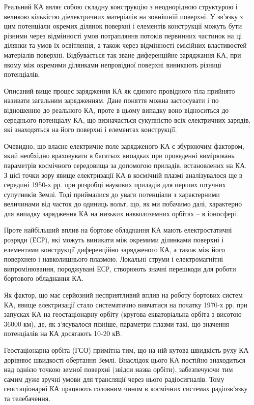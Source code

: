 \documentclass[a4paper,12pt]{article}
\begin{document}
Реальний КА являє собою складну конструкцію з неоднорідною структурою і великою кількістю діелектричних матеріалів на зовнішній поверхні. У зв'язку з цим потенціали окремих ділянок поверхні і елементів конструкції можуть бути різними через відмінності умов потрапляння потоків первинних частинок на ці ділянки та умов їх освітлення, а також через відмінності емісійних властивостей матеріалів поверхні. Відбувається так зване диференційне заряджання КА, при якому між окремими ділянками непровідної поверхні виникають різниці потенціалів.

Описаний вище процес зарядження КА як єдиного провідного тіла прийнято називати загальним зарядженням. Дане поняття можна застосувати і по відношенню до реального КА, проте в цьому випадку воно відноситься до середнього потенціалу КА, що визначається сукупністю всіх електричних зарядів, які знаходяться на його поверхні і елементах конструкції.

Очевидно, що власне електричне поле зарядженого КА є збурюючим фактором, який необхідно враховувати в багатьох випадках при проведенні вимірювань параметрів космічного середовища за допомогою приладів, встановлених на КА. З цієї точки зору явище електризації КА в космічній плазмі аналізувалося ще в середині 1950-х рр. при розробці наукових приладів для перших штучних супутників Землі. Тоді приймалися до уваги потенціали з характерними величинами від часток до одиниць вольт, що, як ми побачимо далі, характерно для випадку зарядження КА на низьких навколоземних орбітах -- в іоносфері.

Проте найбільший вплив на бортове обладнання КА мають електростатичні розряди (ЕСР), які можуть виникати між окремими ділянками поверхні і елементами конструкції диференційно зарядженого КА, а також між його поверхнею і навколишнього плазмою. Локальні струми і електромагнітні випромінювання, породжувані ЕСР, створюють значні перешкоди для роботи бортового обладнання КА.

Як фактор, що має серйозний несприятливий вплив на роботу бортових систем КА, явище електризації стало систематично вивчатися на початку 1970-х рр. при запусках КА на геостаціонарну орбіту (кругова екваторіальна орбіта з висотою ~ 36000 км), де, як з'ясувалося пізніше, параметри плазми такі, що значення потенціалів на КА досягають 10-20 кВ.

Геостаціонарна орбіта (ГСО) примітна тим, що на ній кутова швидкість руху КА дорівнює швидкості обертання Землі. Внаслідок цього КА постійно знаходиться над однією точкою земної поверхні (звідси назва орбіти), забезпечуючи тим самим дуже зручні умови для трансляції через нього радіосигналів. Тому геостаціонарні КА працюють головним чином в космічних системах радіозв'язку та телебачення.
\end{document}
